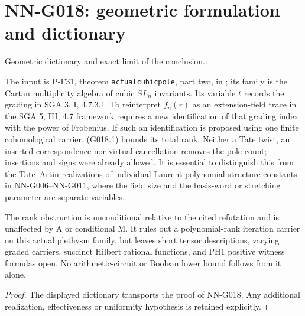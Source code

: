 \section{NN-G018: geometric formulation and dictionary}
\begin{geometricstatement}[NN-G018]
Geometric dictionary and exact limit of the conclusion.:

The input is P-F31, theorem \texttt{actualcubicpole}, part two,
in ; its family is
the Cartan multiplicity algebra of cubic $SL_n$ invariants.
Its variable $t$ records the grading in SGA 3, I, 4.7.3.1.
To reinterpret $f_n(r)$ as an extension-field trace in the
SGA 5, III, 4.7 framework requires a new identification of
that grading index with the power of Frobenius. If such an
identification is proposed using one finite cohomological
carrier, (G018.1) bounds its total rank. Neither a Tate twist,
an inserted correspondence nor virtual cancellation removes
the pole count; insertions and signs were already allowed.
It is essential to distinguish this from the Tate--Artin
realizations of individual Laurent-polynomial structure
constants in NN-G006--NN-G011, where the field size and
the basis-word or stretching parameter are separate variables.

The rank obstruction is unconditional relative to the cited
refutation and is unaffected by A or conditional M. It
rules out a polynomial-rank iteration carrier on this actual
plethysm family, but leaves short tensor descriptions,
varying graded carriers, succinct Hilbert rational functions,
and PH1 positive witness formulas open. No arithmetic-circuit
or Boolean lower bound follows from it alone.


\end{geometricstatement}
\begin{proof} The displayed dictionary transports the proof of NN-G018. Any additional realization, effectiveness or uniformity hypothesis is retained explicitly.\end{proof}



